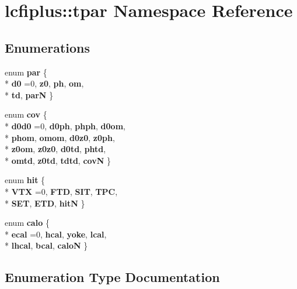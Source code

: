 \section{lcfiplus\-:\-:tpar Namespace Reference}
\label{namespacelcfiplus_1_1tpar}
\subsection*{Enumerations}
\begin{DoxyCompactItemize}
\item 
enum {\bf par} \{ \\*
{\bf d0} =0, 
{\bf z0}, 
{\bf ph}, 
{\bf om}, 
\\*
{\bf td}, 
{\bf par\-N}
 \}
\item 
enum {\bf cov} \{ \\*
{\bf d0d0} =0, 
{\bf d0ph}, 
{\bf phph}, 
{\bf d0om}, 
\\*
{\bf phom}, 
{\bf omom}, 
{\bf d0z0}, 
{\bf z0ph}, 
\\*
{\bf z0om}, 
{\bf z0z0}, 
{\bf d0td}, 
{\bf phtd}, 
\\*
{\bf omtd}, 
{\bf z0td}, 
{\bf tdtd}, 
{\bf cov\-N}
 \}
\item 
enum {\bf hit} \{ \\*
{\bf V\-T\-X} =0, 
{\bf F\-T\-D}, 
{\bf S\-I\-T}, 
{\bf T\-P\-C}, 
\\*
{\bf S\-E\-T}, 
{\bf E\-T\-D}, 
{\bf hit\-N}
 \}
\item 
enum {\bf calo} \{ \\*
{\bf ecal} =0, 
{\bf hcal}, 
{\bf yoke}, 
{\bf lcal}, 
\\*
{\bf lhcal}, 
{\bf bcal}, 
{\bf calo\-N}
 \}
\end{DoxyCompactItemize}


\subsection{Enumeration Type Documentation}
